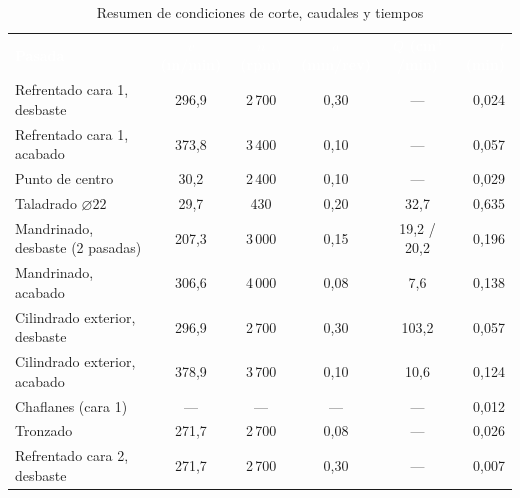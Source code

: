 \documentclass[12pt,a4paper]{article}
\newcommand{\encab}[1]{\textcolor{white}{\sffamily\bfseries #1}}
\begin{document}
\begin{table}[!htb]
	\centering
	\caption{Resumen de condiciones de corte, caudales y tiempos}\label{tab:resumen}
	\footnotesize
	\setlength{\tabcolsep}{3pt}
	\begin{tabular}{l c c c c r}
		\rowcolor{darkblue}
		\encab{Pasada}                   & \encab{$v$ (m/min)} & \encab{$n$ (rpm)} & \encab{$a$ (mm/rev)} & \encab{$Q$ (cm$^3$/min)} & \encab{$t$ (min)} \\
		Refrentado cara 1, desbaste      & 296,9               & 2\,700            & 0,30                 & ---                      & 0,024             \\
		Refrentado cara 1, acabado       & 373,8               & 3\,400            & 0,10                 & ---                      & 0,057             \\
		Punto de centro                  & 30,2                & 2\,400            & 0,10                 & ---                      & 0,029             \\
		Taladrado $\varnothing22$        & 29,7                & 430               & 0,20                 & 32,7                     & 0,635             \\
		Mandrinado, desbaste (2 pasadas) & 207,3               & 3\,000            & 0,15                 & 19,2 / 20,2              & 0,196             \\
		Mandrinado, acabado              & 306,6               & 4\,000            & 0,08                 & 7,6                      & 0,138             \\
		Cilindrado exterior, desbaste    & 296,9               & 2\,700            & 0,30                 & 103,2                    & 0,057             \\
		Cilindrado exterior, acabado     & 378,9               & 3\,700            & 0,10                 & 10,6                     & 0,124             \\
		Chaflanes (cara 1)               & ---                 & ---               &
		---                              & ---                 & 0,012                                                                                   \\
		Tronzado                         & 271,7               & 2\,700            & 0,08                 & ---                      & 0,026             \\
		Refrentado cara 2, desbaste      & 271,7               & 2\,700            & 0,30                 & ---                      & 0,007             \\

\end{tabular}
\end{table}
\end{document}
